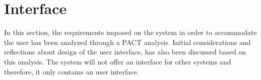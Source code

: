 \section{Interface}\label{sc:interface}
In this section, the requirements imposed on the system in order to accommodate the user has been analyzed through a PACT analysis. Initial considerations and reflections about design of the user interface, has also been discussed based on this analysis. The system will not offer an interface for other systems and therefore, it only contains an user interface.
\par
